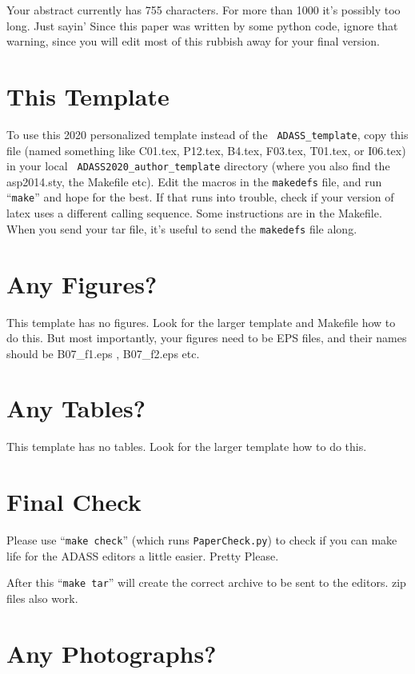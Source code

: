 \documentclass[11pt,twoside]{article}
\begin{document}
Your abstract currently has 755 characters. For more than 1000
it's possibly too long. Just sayin' Since this paper was written by
some python code, ignore that warning, since you will edit most of
this rubbish away for your final version.


\section{This Template}

To use this 2020 personalized template instead of the {\tt
  ADASS\_template}, copy this file (named something like C01.tex,
P12.tex, B4.tex, F03.tex, T01.tex, or I06.tex) in your local {\tt
  ADASS2020\_author\_template} directory (where you also find the
asp2014.sty, the Makefile etc).  Edit the macros in the {\tt makedefs}
file, and run ``{\tt make}'' and hope for the best.  If that runs into
trouble, check if your version of latex uses a different calling
sequence.  Some instructions are in the Makefile. When you send your
tar file, it's useful to send the {\tt makedefs} file along.

\section{Any Figures?}

This template has no figures. Look for the larger template and
Makefile how to do this. But most importantly, your figures need to
be EPS files, and their names should be B07\_f1.eps ,
B07\_f2.eps  etc.

\section{Any Tables?}

This template has no tables. Look for the larger template
how to do this. 

\section{Final Check}

Please use ``{\tt make check}'' (which runs {\tt PaperCheck.py}) to
check if you can make life for the ADASS editors a little
easier. Pretty Please.

After this ``{\tt make tar}'' will create the correct archive to be sent to
the editors. zip files also work.

\section{Any Photographs?}
\end{document}
